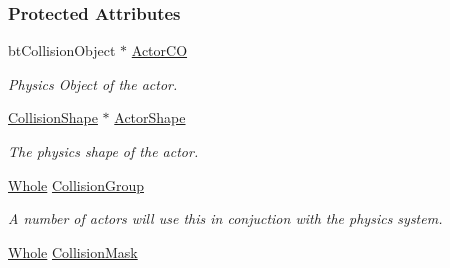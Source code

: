 \subsubsection*{Protected Attributes}
\begin{DoxyCompactItemize}
\item 
\hypertarget{classphys_1_1ActorBasePhysicsSettings_a259d4d10541b28d389ffa287f07ec916}{
btCollisionObject $\ast$ \hyperlink{classphys_1_1ActorBasePhysicsSettings_a259d4d10541b28d389ffa287f07ec916}{ActorCO}}
\label{classphys_1_1ActorBasePhysicsSettings_a259d4d10541b28d389ffa287f07ec916}

\begin{DoxyCompactList}\small\item\em Physics Object of the actor. \item\end{DoxyCompactList}\item 
\hypertarget{classphys_1_1ActorBasePhysicsSettings_ac95d58db5957ab4f160a8cb5cc6c2f1b}{
\hyperlink{classphys_1_1CollisionShape}{CollisionShape} $\ast$ \hyperlink{classphys_1_1ActorBasePhysicsSettings_ac95d58db5957ab4f160a8cb5cc6c2f1b}{ActorShape}}
\label{classphys_1_1ActorBasePhysicsSettings_ac95d58db5957ab4f160a8cb5cc6c2f1b}

\begin{DoxyCompactList}\small\item\em The physics shape of the actor. \item\end{DoxyCompactList}\item 
\hypertarget{classphys_1_1ActorBasePhysicsSettings_a6a95b9dceba9a60f87b2ae0f3109b638}{
\hyperlink{namespacephys_a460f6bc24c8dd347b05e0366ae34f34a}{Whole} \hyperlink{classphys_1_1ActorBasePhysicsSettings_a6a95b9dceba9a60f87b2ae0f3109b638}{CollisionGroup}}
\label{classphys_1_1ActorBasePhysicsSettings_a6a95b9dceba9a60f87b2ae0f3109b638}

\begin{DoxyCompactList}\small\item\em A number of actors will use this in conjuction with the physics system. \item\end{DoxyCompactList}\item 
\hypertarget{classphys_1_1ActorBasePhysicsSettings_ae5f0c41d16868bf67e834b643207521f}{
\hyperlink{namespacephys_a460f6bc24c8dd347b05e0366ae34f34a}{Whole} \hyperlink{classphys_1_1ActorBasePhysicsSettings_ae5f0c41d16868bf67e834b643207521f}{CollisionMask}}
\label{classphys_1_1ActorBasePhysicsSettings_ae5f0c41d16868bf67e834b643207521f}


\end{DoxyCompactItemize}
